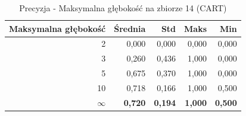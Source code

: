 \begin{table}[htbp]
\centering
\small
\setlength{\tabcolsep}{6pt}
\renewcommand{\arraystretch}{1.2}
\caption{Precyzja - Maksymalna głębokość na zbiorze 14 (CART)}
\label{tab:CART_max_depth_14_precision}
\begin{tabular}{r|r|r|r|r}
\toprule
Maksymalna głębokość & Średnia & Std & Maks & Min \\
\hline
2 & 0,000 & 0,000 & 0,000 & 0,000 \\
3 & 0,260 & 0,436 & 1,000 & 0,000 \\
5 & 0,675 & 0,370 & 1,000 & 0,000 \\
10 & 0,718 & 0,166 & 1,000 & 0,500 \\
\textbf{$\infty$} & \textbf{0,720} & \textbf{0,194} & \textbf{1,000} & \textbf{0,500} \\
\bottomrule
\end{tabular}
\end{table}